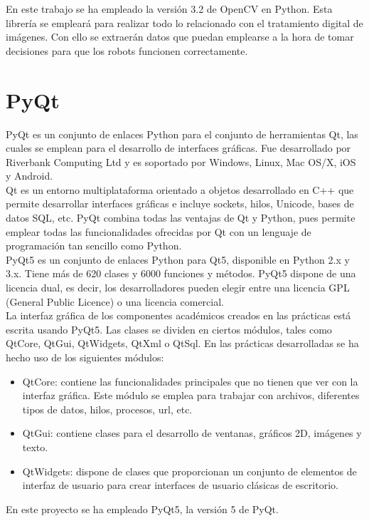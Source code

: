 En este trabajo se ha empleado la versión 3.2 de OpenCV en Python. Esta librería se empleará para realizar todo lo relacionado con el tratamiento digital de imágenes. Con ello se extraerán datos que puedan emplearse a la hora de tomar decisiones para que los robots funcionen correctamente.

\section{PyQt}
PyQt es un conjunto de enlaces Python para el conjunto de herramientas Qt, las cuales se emplean para el desarrollo de interfaces gráficas. Fue desarrollado por Riverbank Computing Ltd y es soportado por Windows, Linux, Mac OS/X, iOS y Android.\\

Qt es un entorno multiplataforma orientado a objetos desarrollado en C++  que permite desarrollar interfaces gráficas e incluye sockets, hilos, Unicode, bases de datos SQL, etc. PyQt combina todas las ventajas de Qt y Python, pues permite emplear todas las funcionalidades ofrecidas por Qt con un lenguaje de programación tan sencillo como Python.\\

PyQt5 es un conjunto de enlaces Python para Qt5, disponible en Python 2.x y 3.x. Tiene más de 620 clases y 6000 funciones y métodos. PyQt5 dispone de una licencia dual, es decir, los desarrolladores pueden elegir entre una licencia GPL (General Public Licence) o una licencia comercial.\\ 

La interfaz gráfica de los componentes académicos creados en las prácticas está escrita usando PyQt5. Las clases se dividen en ciertos módulos, tales como QtCore, QtGui, QtWidgets, QtXml o QtSql. En las prácticas desarrolladas se ha hecho uso de los siguientes módulos:
\begin{itemize}
	\item QtCore: contiene las funcionalidades principales que no tienen que ver con la interfaz gráfica. Este módulo se emplea para trabajar con archivos, diferentes tipos de datos, hilos, procesos, url, etc.
	\item QtGui: contiene clases para el desarrollo de ventanas, gráficos 2D, imágenes y texto.
	\item QtWidgets: dispone de clases que proporcionan un conjunto de elementos de interfaz de usuario para crear interfaces de usuario clásicas de escritorio. 
\end{itemize}

En este proyecto se ha empleado PyQt5, la versión 5 de PyQt. 
